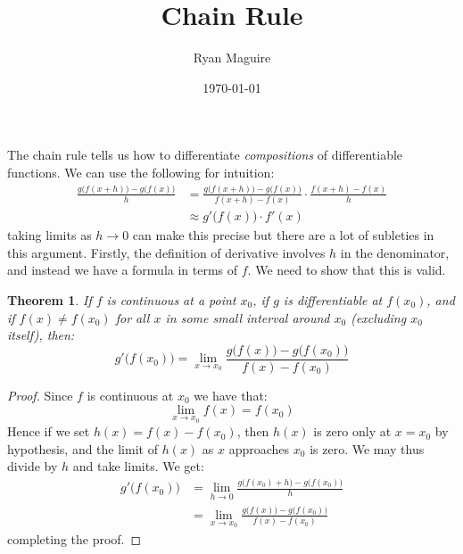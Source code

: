 \documentclass{article}
\title{Chain Rule}
\author{Ryan Maguire}
\date{\today}
\theoremstyle{plain}
\newtheorem{theorem}{Theorem}
\begin{document}
    \maketitle
    The chain rule tells us how to differentiate \textit{compositions} of
    differentiable functions. We can use the following for intuition:
    \begin{align}
        \frac{g\big(f(x+h)\big)-g\big(f(x)\big)}{h}
            &=\frac{g\big(f(x+h)\big)-g\big(f(x)\big)}{f(x+h)-f(x)}
            \cdot\frac{f(x+h)-f(x)}{h}\\
            &\approx
                g'\big(f(x)\big)\cdot{f}'(x)
    \end{align}
    taking limits as $h\rightarrow{0}$ can make this precise but there are a
    lot of subleties in this argument. Firstly, the definition of derivative
    involves $h$ in the denominator, and instead we have a formula
    in terms of $f$. We need to show that this is valid.
    \begin{theorem}
        If $f$ is continuous at a point $x_{0}$, if $g$ is differentiable at
        $f(x_{0})$, and if $f(x)\ne{f}(x_{0})$ for all $x$ in some small
        interval around $x_{0}$ (excluding $x_{0}$ itself),
        then:
        \begin{equation}
            g'\big(f(x_{0})\big)=
                \lim_{x\rightarrow{x}_{0}}
                \frac{g\big(f(x)\big)-g\big(f(x_{0})\big)}{f(x)-f(x_{0})}
        \end{equation}
    \end{theorem}
    \begin{proof}
        Since $f$ is continuous at $x_{0}$ we have that:
        \begin{equation}
            \lim_{x\rightarrow{x}_{0}}f(x)=f(x_{0})
        \end{equation}
        Hence if we set $h(x)=f(x)-f(x_{0})$, then $h(x)$ is zero
        only at $x=x_{0}$ by hypothesis, and the limit of $h(x)$ as $x$
        approaches $x_{0}$ is zero. We may thus divide by $h$ and take
        limits. We get:
        \begin{align}
            g'\big(f(x_{0})\big)
            &=\lim_{h\rightarrow{0}}
                \frac{g\big(f(x_{0})+h\big)-g\big(f(x_{0})\big)}{h}\\
            &=\lim_{x\rightarrow{x}_{0}}
                \frac{g\big(f(x)\big)-g\big(f(x_{0})\big)}{f(x)-f(x_{0})}
        \end{align}
        completing the proof.
    \end{proof}
\end{document}
